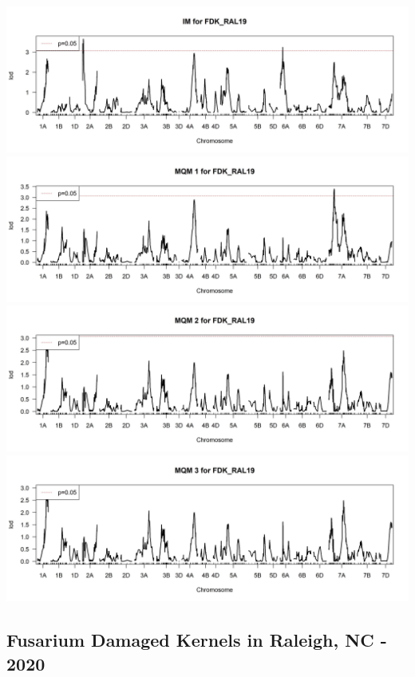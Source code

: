 \documentclass[
]{article}
\begin{document}
\includegraphics{Scan_IM_FDK_RAL19.jpg}
\includegraphics{Scan_MQM1_FDK_RAL19.jpg}
\includegraphics{Scan_MQM2_FDK_RAL19.jpg}
\includegraphics{Scan_MQM3_FDK_RAL19.jpg} \pagebreak

\subsection{Fusarium Damaged Kernels in Raleigh, NC -
2020}\label{fusarium-damaged-kernels-in-raleigh-nc---2020}
\end{document}
